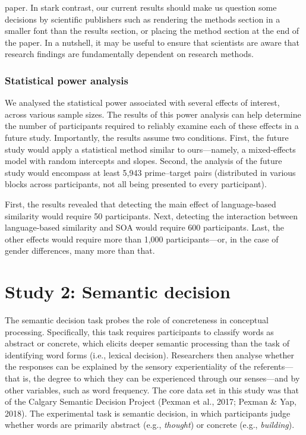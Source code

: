 \documentclass[
  12pt,
  man,floatsintext]{apa7}
\begin{document}
paper. In stark contrast, our current results should make us question some decisions by scientific publishers such as rendering the methods section in a smaller font than the results section, or placing the method section at the end of the paper. In a nutshell, it may be useful to ensure that scientists are aware that research findings are fundamentally dependent on research methods.

\hypertarget{statistical-power-analysis-3}{%
\subsubsection{Statistical power analysis}\label{statistical-power-analysis-3}}

We analysed the statistical power associated with several effects of interest, across various sample sizes. The results of this power analysis can help determine the number of participants required to reliably examine each of these effects in a future study. Importantly, the results assume two conditions. First, the future study would apply a statistical method similar to ours---namely, a mixed-effects model with random intercepts and slopes. Second, the analysis of the future study would encompass at least 5,943 prime--target pairs (distributed in various blocks across participants, not all being presented to every participant).

First, the results revealed that detecting the main effect of language-based similarity would require 50 participants. Next, detecting the interaction between language-based similarity and SOA would require 600 participants. Last, the other effects would require more than 1,000 participants---or, in the case of gender differences, many more than that.

\clearpage

\hypertarget{study-2-semantic-decision}{%
\section{Study 2: Semantic decision}\label{study-2-semantic-decision}}

The semantic decision task probes the role of concreteness in conceptual processing. Specifically, this task requires participants to classify words as abstract or concrete, which elicits deeper semantic processing than the task of identifying word forms (i.e., lexical decision). Researchers then analyse whether the responses can be explained by the sensory experientiality of the referents---that is, the degree to which they can be experienced through our senses---and by other variables, such as word frequency. The core data set in this study was that of the Calgary Semantic Decision Project (Pexman et al., 2017; Pexman \& Yap, 2018). The experimental task is semantic decision, in which participants judge whether words are primarily abstract (e.g., \emph{thought}) or concrete (e.g., \emph{building}).
\end{document}
